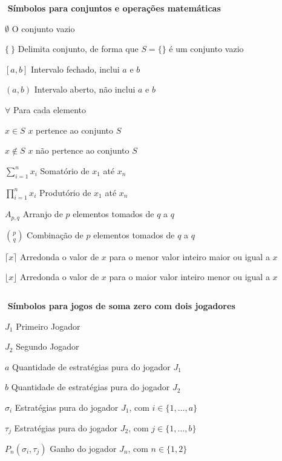 \begin{simbolos}
	\item[$ $] \textbf{Símbolos para conjuntos e operações matemáticas}
	\item[$ \emptyset $] O conjunto vazio
	\item[$ \{\ \} $] Delimita conjunto, de forma que $S = \{\}$ é um conjunto vazio
	\item[$ {[a,b]} $] Intervalo fechado, inclui $a$ e $b$
	\item[$ {(a,b)} $] Intervalo aberto, não inclui $a$ e $b$
	\item[$ \forall $] Para cada elemento
	\item[$ x\in S $] $x$ pertence ao conjunto $S$
	\item[$ x\notin S $] $x$ não pertence ao conjunto $S$
	\item[$ \displaystyle\sum_{i=1}^{n} x_i $] Somatório de $x_1$ até $x_n$
	\item[$ \displaystyle\prod_{i=1}^{n} x_i $] Produtório de $x_1$ até $x_n$
	\item[$ A_{p,q} $] Arranjo de $p$ elementos tomados de $q$ a $q$
	\item[$ \binom{p}{q} $] Combinação de $p$ elementos tomados de $q$ a $q$
	\item[$ \lceil x \rceil $] Arredonda o valor de $x$ para o menor valor inteiro maior ou igual a $x$
	\item[$ \lfloor x \rfloor $] Arredonda o valor de $x$ para o maior valor inteiro menor ou igual a $x$
	\item[$ $]

	\item[$ $] \textbf{Símbolos para jogos de soma zero com dois jogadores}
	\item[$ J_1 $] Primeiro Jogador
	\item[$ J_2 $] Segundo Jogador
	\item[$ a $]  Quantidade de estratégias pura do jogador $J_1$
	\item[$ b $]  Quantidade de estratégias pura do jogador $J_2$
	\item[$ \sigma_i $] Estratégias pura do jogador $J_1$, com $i \in \{1,\ldots,a\}$
	\item[$ \tau_j $] Estratégias pura do jogador $J_2$, com $j \in \{1,\ldots,b\}$
	\item[$ P_{n}(\sigma_i,\tau_j) $] Ganho do jogador $J_n$, com $n \in \{1,2\}$
	\item[$ $]

\end{simbolos}

